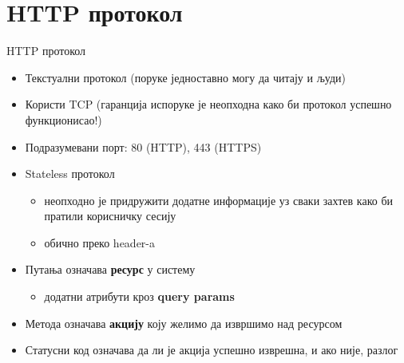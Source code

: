 \documentclass[aspectratio=169]{beamer}
\begin{document}
    \section{HTTP протокол}
    
    \begin{frame}{HTTP протокол}
        \begin{itemize}
            \item Текстуални протокол (поруке једноставно могу да читају и људи)
            \item Користи TCP (гаранција испоруке је неопходна како би протокол успешно функционисао!)
            \item Подразумевани порт: 80 (HTTP), 443 (HTTPS)
            \item Stateless протокол
            \begin{itemize}
                \item неопходно је придружити додатне информације уз сваки захтев како би пратили корисничку сесију
                \item обично преко header-a
            \end{itemize}
            \item Путања означава \textbf{ресурс} у систему
            \begin{itemize}
                \item додатни атрибути кроз \textbf{query params}
            \end{itemize}
            \item Метода означава \textbf{акцију} коју желимо да извршимо над ресурсом
            \item Статусни код означава да ли је акција успешно изврешна, и ако није, разлог
        \end{itemize}
    \end{frame}
    
\end{document}
